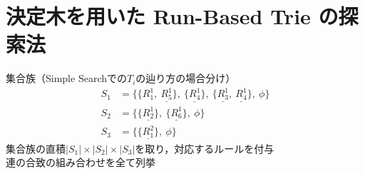 \documentclass[12pt,dvipdfmx,mathserif,uplatex,aspectratio=32]{beamer}
\begin{document}














\section{決定木を用いた Run-Based Trie の探索法}
\begin{frame}{集合族（Simple Searchでの$T_{i}$の辿り方の場合分け）}
\vspace{-3mm}
\centering{
 \scalebox{0.6}{}
}
\vspace{-2mm}
 \begin{align*}
  S_{1} &= \{\{ R_{1}^{1}, \ \underline{ R_{5}^{1}} \}, \ \{ \underline{ R_{4}^{1}} \}, \ \{\underline{ R_{3}^{1}}, \ \underline{ R_{4}^{1}} \}, \ \phi \}  \\
  S_{2} &= \{ \{ \underline{ R_{2}^{1}} \}, \ \{ \underline{ R_{6}^{1}} \}, \ \phi \}  \\
  S_{3} &= \{ \{ \underline{ R_{1}^{2}} \}, \ \phi \} 
 \end{align*}
集合族の直積$|S_{1}| \times |S_{2}| \times |S_{3}|$を取り，対応するルールを付与 \\ 
\vspace{1mm}
連の合致の組み合わせを全て列挙
\end{frame}
\end{document}
